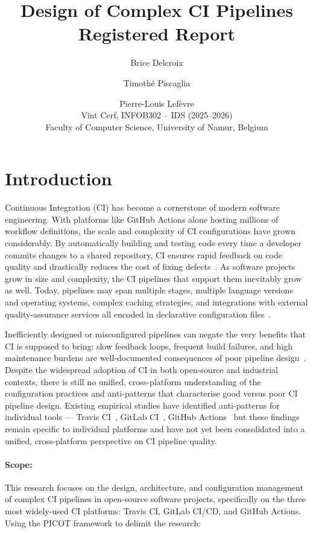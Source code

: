 \documentclass[12pt, a4paper]{article}
\title{\textbf{Design of Complex CI Pipelines}\\[0.5em]
\Large Registered Report}
\author{
    Brice Delcroix \and Timoth\'{e} Piscaglia \and Pierre-Louis Lef\`{e}vre\\[0.5em]
    \small Vint Cerf, INFOB302 -- IDS (2025--2026)\\
    \small Faculty of Computer Science, University of Namur, Belgium
}
\date{}
\begin{document}
\maketitle

\section{Introduction}

Continuous Integration (CI) has become a cornerstone of modern software engineering.
With platforms like GitHub Actions alone hosting millions of workflow definitions,
the scale and complexity of CI configurations have grown considerably.
By automatically building and testing code every time a developer commits changes
to a shared repository, CI ensures rapid feedback on code quality and drastically
reduces the cost of fixing defects~\cite{kinsman2021}.
As software projects grow in size and complexity, the CI pipelines that support
them inevitably grow as well. Today, pipelines may span multiple stages, multiple
language versions and operating systems, complex caching strategies, and integrations
with external quality-assurance services all encoded in declarative configuration
files~\cite{beller2017, dutta2025}.

Inefficiently designed or misconfigured pipelines can negate the very benefits that
CI is supposed to bring: slow feedback loops, frequent build failures, and high
maintenance burdens are well-documented consequences of poor pipeline design~\cite{dutta2025, hilton2016}.
Despite the widespread adoption of CI in both open-source and industrial contexts,
there is still no unified, cross-platform understanding of the configuration practices
and anti-patterns that characterise good versus poor CI pipeline design.
Existing empirical studies have identified anti-patterns for individual tools --- Travis
CI~\cite{gallaba2020}, GitLab CI~\cite{vassallo2020b}, GitHub Actions~\cite{kinsman2021} but
these findings remain specific to individual platforms and have not yet been consolidated
into a unified, cross-platform perspective on CI pipeline quality.

\paragraph{Scope:}
This research focuses on the design, architecture, and configuration management of
complex CI pipelines in open-source software projects, specifically on the three
most widely-used CI platforms: Travis CI, GitLab CI/CD, and GitHub Actions.
Using the PICOT framework to delimit the research:
\end{document}
